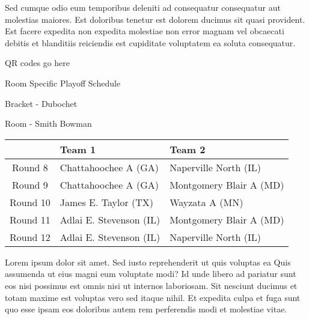 \documentclass{article}%
\begin{document}
\newline%
Sed cumque odio eum temporibus deleniti ad consequatur consequatur aut molestias maiores. Est doloribus tenetur est dolorem ducimus sit quasi provident. Est facere expedita non expedita molestiae non error magnam vel obcaecati debitis et blanditiis reiciendis est cupiditate voluptatem ea soluta consequatur.%
\vspace*{140pt}%
\begin{center}%
\begin{Huge}%
QR codes go here%
\end{Huge}%
\end{center}%
\newpage%
\begin{center}%
\begin{Huge}%
Room Specific Playoff Schedule%
\end{Huge}%
\vspace*{8pt}%
\linebreak%
\begin{Large}%
Bracket {-} Dubochet%
\end{Large}%
\vspace*{8pt}%
\linebreak%
\vspace*{8pt}%
\begin{Large}%
Room {-} Smith Bowman%
\end{Large}%
\end{center}%
%
\begin{tabularx}{\textwidth}{|c|Y|Y|}%
\hline%
&Team 1&Team 2\\%
\hline%
Round 8&Chattahoochee A (GA)&Naperville North (IL)\\%
Round 9&Chattahoochee A (GA)&Montgomery Blair A (MD)\\%
Round 10&James E. Taylor (TX)&Wayzata A (MN)\\%
Round 11&Adlai E. Stevenson (IL)&Montgomery Blair A (MD)\\%
Round 12&Adlai E. Stevenson (IL)&Naperville North (IL)\\%
\hline%
\end{tabularx}%
\vspace*{8pt}%
\newline%
Lorem ipsum dolor sit amet. Sed iusto reprehenderit ut quis voluptas ea Quis assumenda ut eius magni eum voluptate modi? Id unde libero ad pariatur sunt eos nisi possimus est omnis nisi ut internos laboriosam. Sit nesciunt ducimus et totam maxime est voluptas vero sed itaque nihil. Et expedita culpa et fuga sunt quo esse ipsam eos doloribus autem rem perferendis modi et molestiae vitae.\newline%
\end{document}
